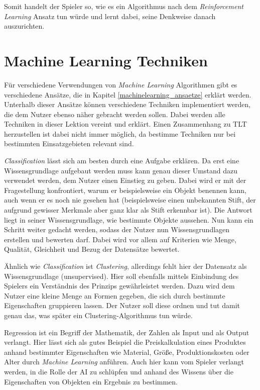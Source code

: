 Somit handelt der Spieler so, wie es ein Algorithmus nach dem \textit{Reinforcement Learning} Ansatz tun würde und lernt dabei, seine Denkweise danach auszurichten.

\section{Machine Learning Techniken}
\label{lm_mltechniken}

Für verschiedene Verwendungen von \textit{Machine Learning} Algorithmen gibt es verschiedene Ansätze, die in Kapitel \ref{machinelearning_ansaetze} erklärt werden. Unterhalb dieser Ansätze können verschiedene Techniken implementiert werden, die dem Nutzer ebenso näher gebracht werden sollen. Dabei werden alle Techniken in dieser Lektion vereint und erklärt. Einen Zusammenhang zu TLT herzustellen ist dabei nicht immer möglich, da bestimme Techniken nur bei bestimmten Einsatzgebieten relevant sind.

\textit{Classification} lässt sich am besten durch eine Aufgabe erklären. Da erst eine Wissensgrundlage aufgebaut werden muss kann genau dieser Umstand dazu verwendet werden, dem Nutzer einen Einstieg zu geben. Dabei wird er mit der Fragestellung konfrontiert, warum er beispielsweise ein Objekt benennen kann, auch wenn er es noch nie gesehen hat (beispielsweise einen unbekannten Stift, der aufgrund gewisser Merkmale aber ganz klar als Stift erkennbar ist). Die Antwort liegt in seiner Wissensgrundlage, wie bestimmte Objekte aussehen. Nun kann ein Schritt weiter gedacht werden, sodass der Nutzer nun Wissensgrundlagen erstellen und bewerten darf. Dabei wird vor allem auf Kriterien wie Menge, Qualität, Gleichheit und Bezug der Datensätze bewertet. 

Ähnlich wie \textit{Classification} ist \textit{Clustering}, allerdings fehlt hier der Datensatz als Wissensgrundlage (unsupervised). Hier soll ebenfalls mittels Einbindung des Spielers ein Verständnis des Prinzips gewährleistet werden. Dazu wird dem Nutzer eine kleine Menge an Formen gegeben, die sich durch bestimmte Eigenschaften gruppieren lassen. Der Nutzer soll diese ordnen und tut damit genau das, was später ein Clustering-Algorithmus tun würde.

Regression ist ein Begriff der Mathematik, der Zahlen als Input und als Output verlangt. Hier lässt sich als gutes Beispiel die Preiskalkulation eines Produktes anhand bestimmter Eigenschaften wie Material, Größe, Produktionskosten oder Alter durch \textit{Machine Learning} anführen. Auch hier kann vom Spieler verlangt werden, in die Rolle der AI zu schlüpfen und anhand des Wissens über die Eigenschaften von Objekten ein Ergebnis zu bestimmen. 

